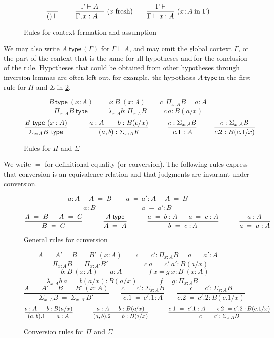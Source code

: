 \documentclass[11pt,a4paper]{article}
\theoremstyle{definition}
\newcommand{\conv}{=}
\newcommand{\type}{\mathsf{type}}
\newcommand{\mylam}[3]{\lambda_{#1:#2}#3}
\newcommand{\mypi}[3]{\Pi_{#1:#2}#3}
\newcommand{\mysig}[3]{\Sigma_{#1:#2}#3}
\newcommand{\app}[2]{{#1\,#2}} %
\begin{document}
\begin{figure}[h]
  \caption{Rules for context formation and assumption}\label{fig:context}
$$
\frac{}{()\vdash}~~~~~~~
\frac{\Gamma\vdash A}{\Gamma,x:A\vdash}~(x~\text{fresh})~~~~~~
\frac{\Gamma\vdash}{\Gamma\vdash x:A}~(x\!:\! A~\text{in}~\Gamma)
\belowdisplayshortskip 0pt
$$
\end{figure}

We may also write $A~\type~(\Gamma)$ for $\Gamma\vdash A$,
and may omit the global context $\Gamma$,
or the part of the context that is the same for all hypotheses and for the
conclusion of the rule.
Hypotheses that could be obtained from other
hypotheses through inversion lemmas are often left out,
for example, the hypothesis $A~\type$ in the first rule for $\Pi$ and $\Sigma$
in \cref{fig:PiSig}.

\begin{figure}[h]
  \caption{Rules for $\Pi$ and $\Sigma$}\label{fig:PiSig}
$$
\frac{B~\type~(x:A)}{\mypi{x}{A}{B}~\type}~~~~~~~~~
\frac{b:B~(x:A)}{\mylam{x}{A}{b}:\mypi{x}{A}{B}}~~~~~~~~
\frac{c:\mypi{x}{A}{B}~~~~~~a:A}
     {\app{c}{a}:B(a/x)}
$$
$$
\frac{B~\type~(x:A)}{\mysig{x}{A}{B}~\type}~~~~~~~~~
\frac{a:A~~~~~~b:B(a/x)}{(a,b):\mysig{x}{A}{B}}~~~~~~~~
\frac{c:\mysig{x}{A}{B}}{c.1:A}~~~~~~~
\frac{c:\mysig{x}{A}{B}}{c.2:B(c.1/x)}
\belowdisplayshortskip -1pt
$$
\end{figure}


We write $\conv$ for definitional equality (or conversion).
The following rules express that conversion is an equivalence
relation and that judgments are invariant under conversion.

\begin{figure}[h]
  \caption{General rules for conversion}\label{fig:conversion}
$$
\frac{ a:A~~~~~~ A~ \conv~ B}{ a:B}~~~~~~~~~
\frac{ a ~\conv~a':A~~~~~~ A  ~\conv~ B}{ a ~\conv~a':B}
$$
$$
\frac{A~=~B~~~~~A~=~C}{B~=~C}~~~~~~~~~\frac{A~\type}{A~=~A}~~~~~~~~~
\frac{a~=~b:A~~~~~a~=~c:A}{b~=~c:A}~~~~~~~~~\frac{a:A}{a~=~a:A}
\belowdisplayshortskip 1pt
$$
\end{figure}

\begin{figure}[H]
  \caption{Conversion rules for $\Pi$ and $\Sigma$}\label{fig:convPiSig}
$$
\frac{A~=~A'~~~~~~B~=~B'~(x:A)}{\mypi{x}{A}{B}~=~\mypi{x}{A'}{B'}}~~~~~~~~
\frac{c~=~c':\mypi{x}{A}{B}~~~~~~a~=~a':A}{c~a~=~c'~a':B(a/x)}
$$
$$
\frac{b:B~(x:A)~~~~~~~~ a:A}{ \mylam{x}{A}{b}~a  ~\conv~ b(a/x):B(a/x)}
~~~~~~~
\frac{f~x = g~x:B~(x:A)}{ f = g : \mypi{x}{A}{B}}
$$
$$
\frac{A~=~A'~~~~~~B~=~B'~(x:A)}{\mysig{x}{A}{B}~=~\mysig{x}{A'}{B'}}~~~~~~~~
\frac{c~=~c':\mysig{x}{A}{B}}{c.1~=~c'.1:A}~~~~~~~~
\frac{c~=~c':\mysig{x}{A}{B}}{c.2~=~c'.2:B(c.1/x)}~~~~~~~~
$$
$$
\frac{a:A~~~~~b:B(a/x)}{ (a,b).1 ~\conv~ a:A}~~~~~~~~~~
\frac{a:A~~~~~b:B(a/x)}{ (a,b).2 ~\conv~ b:B(a/x)}~~~~~~~~~~
\frac{c.1~=~ c'.1:A~~~~~~c.2~=c'.2:B(c.1/x)}{ c~=~ c' : \mysig{x}{A}{B}}
\belowdisplayshortskip 0pt
$$
\end{figure}
\end{document}

